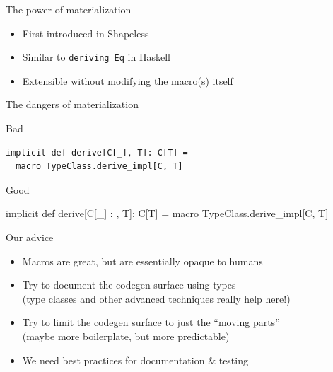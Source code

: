 \documentclass[compress,xcolor={usenames,dvipsnames,table}]{beamer}
\begin{document}
\begin{frame}{The power of materialization}
  \begin{itemize}
    \item First introduced in Shapeless
    \item Similar to \texttt{deriving Eq} in Haskell
    \item Extensible without modifying the macro(s) itself
  \end{itemize}
\end{frame}

\begin{frame}[fragile]{The dangers of materialization}
  \vspace{1em}
  \begin{alertblock}{Bad}
    \begin{verbatim}
implicit def derive[C[_], T]: C[T] =
  macro TypeClass.derive_impl[C, T]
    \end{verbatim}
  \end{alertblock}

  \vspace{1em}
  \begin{exampleblock}{Good}
    \begin{semiverbatim}
implicit def derive[C[_] : \text{\color{blue}{TypeClass}}, T]: C[T] =
  macro TypeClass.derive_impl[C, T]
    \end{semiverbatim}
  \end{exampleblock}
\end{frame}

\begin{frame}[fragile]{Our advice}
  \begin{itemize}
    \item Macros are great, but are essentially opaque to humans
    \item Try to document the codegen surface using types\\
      (type classes and other advanced techniques really help here!)
    \item Try to limit the codegen surface to just the ``moving parts''\\
      (maybe more boilerplate, but more predictable)
    \item We need best practices for documentation \& testing
  \end{itemize}
\end{frame}

\end{document}
